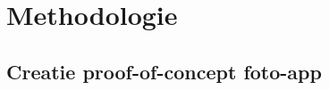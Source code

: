 
\chapter{Methodologie}
\label{ch:methodologie}


\section{Creatie proof-of-concept foto-app}
\label{sec:proofofconcept}


